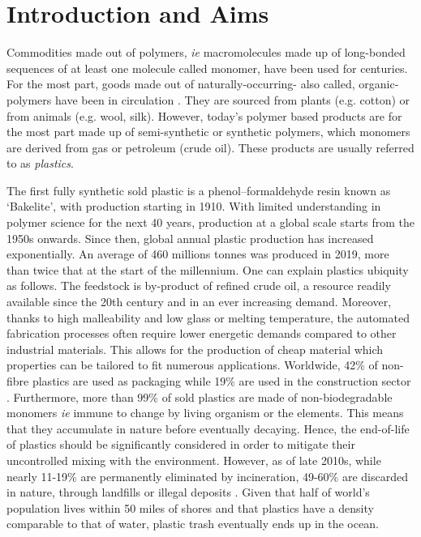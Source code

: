 \chapter{Introduction and Aims}
Commodities made out of polymers, \textit{ie} macromolecules made up of long-bonded sequences of at least one molecule called monomer, have been used for centuries. For the most part, goods made out of naturally-occurring- also called, organic-polymers have been in circulation \autocite{y2011}. 
They are sourced from plants (e.g. cotton) or from animals (e.g. wool, silk). 
However, today's polymer based products are for the most part made up of semi-synthetic or synthetic polymers, which monomers are derived from gas or petroleum (crude oil). These products are usually referred to as \textit{plastics}.\autocite{y2011} 

The first fully synthetic sold plastic is a phenol–formaldehyde resin known as ‘Bakelite’, with production starting in 1910.\autocite{y2011} With limited understanding in polymer science for the next 40 years, production at a global scale starts from the 1950s onwards. 
Since then, global annual plastic production has increased exponentially. An average of 460 millions tonnes was produced in 2019, more than twice that at the start of the millennium.\autocite{g2017}
One can explain plastics ubiquity as follows. The feedstock is by-product of refined crude oil, a resource readily available since the 20th century and in an ever increasing demand.\autocite{wang2022} 
Moreover, thanks to high malleability and low glass or melting temperature, the automated fabrication processes often require lower energetic demands compared to other industrial materials. This allows for the production of cheap material which properties can be tailored to fit numerous applications. 
Worldwide, 42\% of non-fibre plastics are used as packaging while 19\% are used in the construction sector \autocite{g2017}. 
Furthermore, more than 99\% of sold plastics are made of non-biodegradable monomers \textit{ie} immune to change by living organism or the elements\autocite{g2017}. 
This means that they accumulate in nature before eventually decaying. 
Hence, the end-of-life of plastics should be significantly considered in order to mitigate their uncontrolled mixing with the environment. 
However, as of late 2010s, while nearly 11-19\% are permanently eliminated by incineration, 49-60\% are discarded in nature, through landfills or illegal deposits \autocite{g2017,dok2024}. 
Given that half of world's population lives within 50 miles of shores and that plastics have a density comparable to that of water, plastic trash eventually ends up in the ocean\autocite{c2011}.

